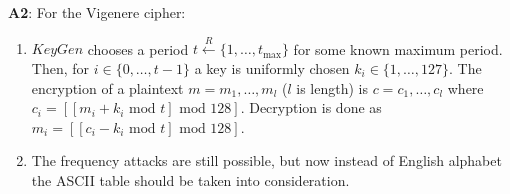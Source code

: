 \documentclass[12pt,reqno]{amsart}
\begin{document}
\textbf{A2}: For the Vigenere cipher:
\begin{enumerate}[label=\alph*]
\item $KeyGen$ chooses a period $t \xleftarrow{R} \{1, \ldots, t_{\text{max}}\}$ for some known maximum period. Then, for $i \in \{0, \ldots, t-1\}$ a key is uniformly chosen $k_i \in \{1,\ldots,127\}$. The encryption of a plaintext $m=m_1, \ldots, m_l$ ($l$ is length) is $c=c_1, \ldots, c_l$ where $c_i = [[m_i + k_i \text{ mod } t] \text{ mod } 128]$. Decryption is done as $m_i = [[c_i - k_i \text{ mod } t] \text{ mod } 128]$.
\item The frequency attacks are still possible, but now instead of English alphabet the ASCII table should be taken into consideration.
\end{enumerate}
\end{document}

